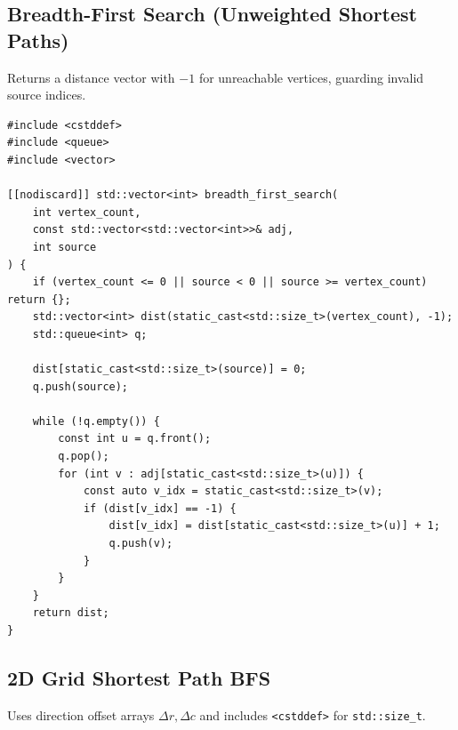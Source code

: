 \documentclass[11pt,a4paper]{article}
\theoremstyle{definition}
\begin{document}
\subsection{Breadth-First Search (Unweighted Shortest Paths)}
Returns a distance vector with $-1$ for unreachable vertices, guarding invalid source indices.

\begin{lstlisting}[caption={Breadth-First Search for unweighted shortest paths}]
#include <cstddef>
#include <queue>
#include <vector>

[[nodiscard]] std::vector<int> breadth_first_search(
    int vertex_count,
    const std::vector<std::vector<int>>& adj,
    int source
) {
    if (vertex_count <= 0 || source < 0 || source >= vertex_count) return {};
    std::vector<int> dist(static_cast<std::size_t>(vertex_count), -1);
    std::queue<int> q;

    dist[static_cast<std::size_t>(source)] = 0;
    q.push(source);

    while (!q.empty()) {
        const int u = q.front();
        q.pop();
        for (int v : adj[static_cast<std::size_t>(u)]) {
            const auto v_idx = static_cast<std::size_t>(v);
            if (dist[v_idx] == -1) {
                dist[v_idx] = dist[static_cast<std::size_t>(u)] + 1;
                q.push(v);
            }
        }
    }
    return dist;
}
\end{lstlisting}

\subsection{2D Grid Shortest Path BFS}
Uses direction offset arrays $\Delta r, \Delta c$ and includes \texttt{<cstddef>} for \texttt{std::size\_t}.
\end{document}
